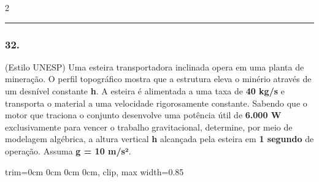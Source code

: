 \documentclass[twoside, 10pt, a4paper]{article}
\newlength{\espacoPreQuestao}\setlength{\espacoPreQuestao}{0.1cm}
\newlength{\espacoQuestao}\setlength{\espacoQuestao}{0.2cm}
\newcommand{\larguraTikz}{0.85\linewidth}
\begin{document}
\begin{multicols*}{2}
\noindent\textcolor{CorLinha}{\rule{\linewidth}{0.5pt}} 
\par\vspace{\espacoPreQuestao}
\subsubsection*{32.} (Estilo UNESP) Uma esteira transportadora inclinada opera em uma planta de mineração. O perfil topográfico mostra que a estrutura eleva o minério através de um desnível constante \textbf{h}. A esteira é alimentada a uma taxa de \textbf{40 kg/s} e transporta o material a uma velocidade rigorosamente constante. Sabendo que o motor que traciona o conjunto desenvolve uma potência útil de \textbf{6.000 W} exclusivamente para vencer o trabalho gravitacional, determine, por meio de modelagem algébrica, a altura vertical \textbf{h} alcançada pela esteira em \textbf{1 segundo} de operação. Assuma \textbf{g = 10 m/s²}.
\begin{center}
\begin{adjustbox}{trim=0cm 0cm 0cm 0cm, clip, max width=\larguraTikz}
\end{adjustbox}
\end{center}
\par\vspace{\espacoQuestao}

\end{multicols*}
\end{document}
